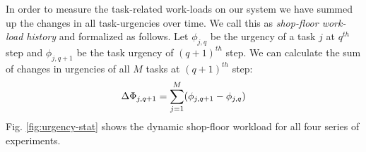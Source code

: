 \documentclass[journal]{IEEEtran}
\begin{document}
In order to measure the task-related work-loads on our system we have summed up the changes in all task-urgencies over time. We call this as {\em shop-floor work-load history} and formalized as follows. Let $ \phi_{j, q}$ be the urgency of a task $j$ at $q^{th}$ step and $\phi_{j, q+1}$ be the task urgency of $(q+1)^{th}$ step. We can calculate the sum of changes in urgencies of all $M$ tasks at $(q+1)^{th}$ step:
\begin{equation} 
\begin{small}
\Delta \Phi_{j, q+1} = \sum_{j=1}^{M} (\phi_{j, q+1} - \phi_{j, q})
\label{eqn:Delta-Phi}
\end{small}
\end{equation}
Fig. \ref{fig:urgency-stat} shows the dynamic shop-floor workload for all four series of experiments. 
\end{document}
